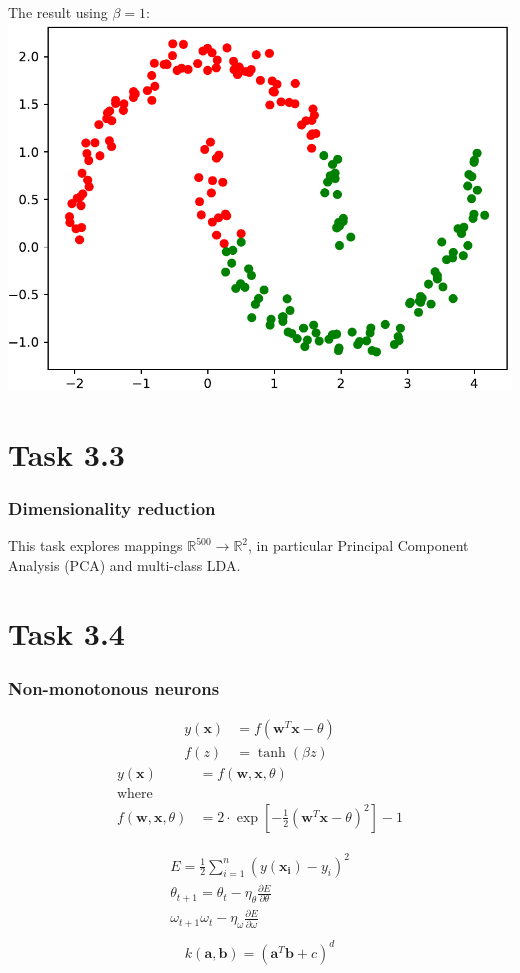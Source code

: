 \documentclass{beamer}
\begin{document}
\begin{frame}
	The result using $\beta = 1:$
	\includegraphics[width=\linewidth]{graphics/task_3_2}
\end{frame}

\section{Task 3.3}
\begin{frame}
	\frametitle{Dimensionality reduction}
	This task explores mappings $\mathbb{R}^{500} \to \mathbb{R}^2$, in particular Principal Component Analysis (PCA) and multi-class LDA.
\end{frame}

\section{Task 3.4}

\begin{frame}
	\frametitle{Non-monotonous neurons}
	\begin{align*}
		y(\mathbf{x}) &= f(\mathbf{w}^T\mathbf{x}-\theta)\\
		f(z) &= \tanh(\beta z)
	\end{align*}
	\begin{align*}
		y(\mathbf{x})&= f(\mathbf{w},\mathbf{x},\theta)\\
		\text{where }\\
		f(\mathbf{w},\mathbf{x},\theta) &= 2\cdot\exp\left[-\frac{1}{2}(\mathbf{w}^T\mathbf{x}-\theta)^2\right]-1
	\end{align*}
\end{frame}
\begin{frame}
	\begin{align*}
	E = \frac{1}{2}\sum_{i=1}^{n}(y(\mathbf{x_i})-y_i)^2\\
	\theta_{t+1} = \theta_{t} - \eta_\theta \frac{\partial E}{\partial \theta}\\
	\omega_{t+1} \omega_{t} - \eta_\omega \frac{\partial E}{\partial \omega}\\
	\end{align*}
	\begin{align*}
		k(\mathbf{a},\mathbf{b}) = (\mathbf{a}^T\mathbf{b}+c)^d
	\end{align*}
\end{frame}
\end{document}
